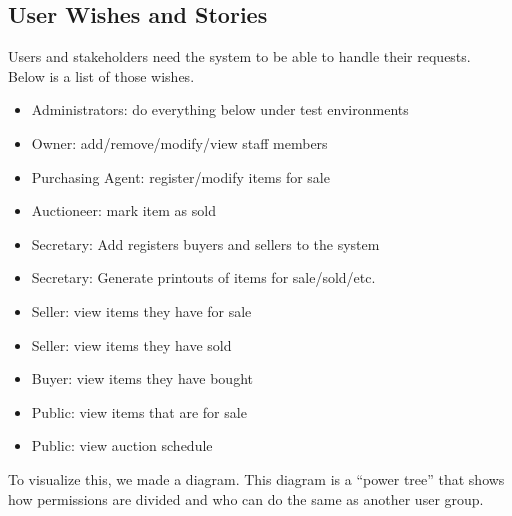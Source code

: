 \documentclass{article}
\begin{document}
\subsection*{User Wishes and Stories}
Users and stakeholders need the system to be able to handle their requests. Below is a list of those wishes.
\begin{itemize}
	\item Administrators: do everything below under test environments
	\item Owner: add/remove/modify/view staff members
	\item Purchasing Agent: register/modify items for sale
	\item Auctioneer: mark item as sold
	\item Secretary: Add registers buyers and sellers to the system
	\item Secretary: Generate printouts of items for sale/sold/etc.
	\item Seller: view items they have for sale
	\item Seller: view items they have sold
	\item Buyer: view items they have bought
	\item Public: view items that are for sale
	\item Public: view auction schedule
\end{itemize}
To visualize this, we made a diagram. This diagram is a ``power tree'' that shows how permissions are divided and who can do the same as another user group.
\end{document}
